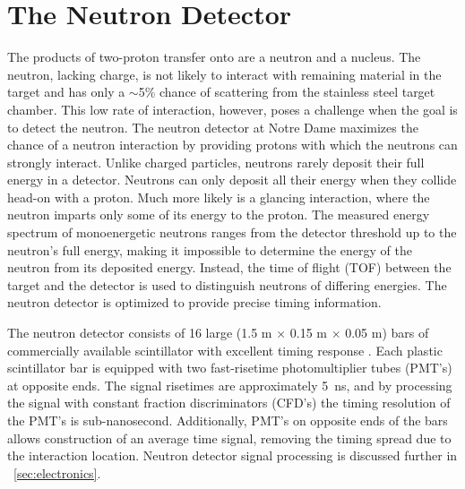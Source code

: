 \section{The Neutron Detector}
\label{sec:detector}

The products of two-proton transfer onto \GeTargets are a neutron and a \SeProducts nucleus.  The neutron, lacking charge, is not likely to interact with remaining material in the target and has only a $\sim$5\% chance of scattering from the stainless steel target chamber.  This low rate of interaction, however, poses a challenge when the goal is to detect the neutron.  The neutron detector at Notre Dame maximizes the chance of a neutron interaction by providing protons with which the neutrons can strongly interact.  Unlike charged particles, neutrons rarely deposit their full energy in a detector.  Neutrons can only deposit all their energy when they collide head-on with a proton.  Much more likely is a glancing interaction, where the neutron imparts only some of its energy to the proton.  The measured energy spectrum of monoenergetic neutrons ranges from the detector threshold up to the neutron's full energy, making it impossible to determine the energy of the neutron from its deposited energy.  Instead, the time of flight (TOF) between the target and the detector is used to distinguish neutrons of differing energies.  The neutron detector is optimized to provide precise timing information.       

The neutron detector \citep{KolataNeutwall} consists of 16 large (1.5 m $\times$ 0.15 m $\times$ 0.05 m) bars of commercially available scintillator with excellent timing response \citep{BC408}.  Each plastic scintillator bar is equipped with two fast-risetime photomultiplier tubes (PMT's) at opposite ends.  The signal risetimes are approximately 5~ns, and by processing the signal with constant fraction discriminators (CFD's) the timing resolution of the PMT's is sub-nanosecond.  Additionally, PMT's on opposite ends of the bars allows construction of an average time signal, removing the timing spread due to the interaction location.  Neutron detector signal processing is discussed further in {\sect}~\ref{sec:electronics}.

